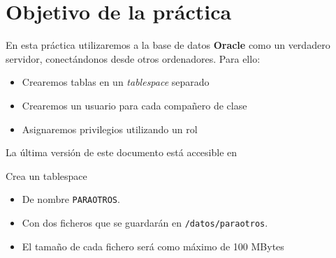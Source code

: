
\usepackage{eurosym}





\renewcommand{\hmwkTitle}{Usuarios y permisos}
\renewcommand{\hmwkClass}{ASGBD}

\usepackage{blindtext}






\primerapagina

\section{Objetivo de la práctica}
En esta práctica utilizaremos a la base de datos \textbf{Oracle} como un verdadero servidor, conectándonos desde otros ordenadores. Para ello:
\begin{itemize}
\item Crearemos tablas en un \textit{tablespace} separado
\item Crearemos un usuario para cada compañero de clase
\item Asignaremos privilegios utilizando un rol
\end{itemize}

La última versión de este documento está accesible en 

\begin{homeworkProblem}

  Crea un tablespace
  \begin{itemize}
  \item De nombre \texttt{PARAOTROS}.
  \item Con dos ficheros que se guardarán en \texttt{/datos/paraotros}.
  \item El tamaño de cada fichero será como máximo de 100 MBytes
  \end{itemize}

\end{homeworkProblem}



